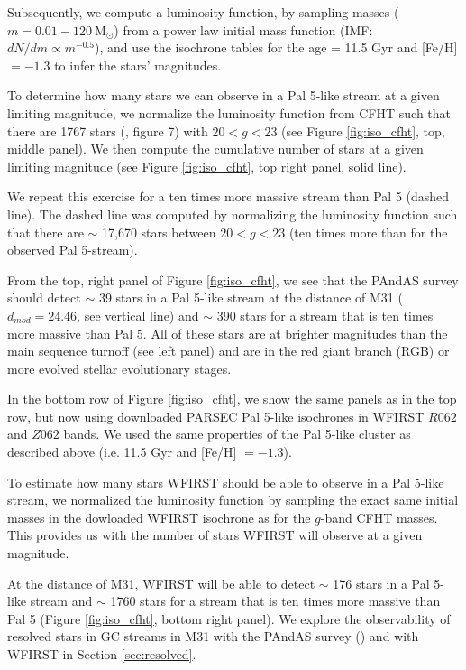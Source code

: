 \documentclass[twocolumn]{aastex62}
\newcommand{\msun}{\textrm{M}_\odot}
\begin{document}
Subsequently, we compute a luminosity function, by sampling masses ($m = 0.01 - 120 ~\msun$) from a power law initial mass function (IMF: $dN/dm \propto m^{-0.5}$), and use the isochrone tables for the age = 11.5 Gyr and [Fe/H] $= -1.3$ to infer the stars' magnitudes. 

To determine how many stars we can observe in a Pal 5-like stream at a given limiting magnitude, we normalize the luminosity function from CFHT such that there are 1767 stars (\citealt{ibata16}, figure 7) with $20 < g < 23$ (see Figure \ref{fig:iso_cfht}, top, middle panel). We then compute the cumulative number of stars at a given limiting magnitude (see Figure \ref{fig:iso_cfht}, top right panel, solid line).

We repeat this exercise for a ten times more massive stream than Pal 5 (dashed line). The dashed line was computed by normalizing the luminosity function such that there are $\sim$ 17,670 stars between $20 < g < 23$ (ten times more than for the observed Pal 5-stream). 

From the top, right panel of Figure \ref{fig:iso_cfht}, we see that the PAndAS survey should detect $\sim$ 39 stars in a Pal 5-like stream at the distance of M31 ($d_{mod} = 24.46$, see vertical line) and $\sim$ 390 stars for a stream that is ten times more massive than Pal 5. All of these stars are at brighter magnitudes than the main sequence turnoff (see left panel) and are in the red giant branch (RGB) or more evolved stellar evolutionary stages. 

In the bottom row of Figure \ref{fig:iso_cfht}, we show the same panels as in the top row, but now using downloaded PARSEC Pal 5-like isochrones in WFIRST $R062$ and $Z062$ bands. We used the same properties of the Pal 5-like cluster as described above (i.e. 11.5 Gyr and [Fe/H] $= -1.3$). 

To estimate how many stars WFIRST should be able to observe in a Pal 5-like stream, we normalized the luminosity function by sampling the exact same initial masses in the dowloaded WFIRST isochrone as for the $g$-band CFHT masses. This provides us with the number of stars WFIRST will observe at a given magnitude. 

At the distance of M31, WFIRST will be able to detect $\sim$ 176 stars in a Pal 5-like stream and $\sim$ 1760 stars for a stream that is ten times more massive than Pal 5 (Figure \ref{fig:iso_cfht}, bottom right panel). We explore the observability of resolved stars in GC streams in M31 with the PAndAS survey (\citealt{mcconnachie09}) and with WFIRST in Section \ref{sec:resolved}. 
\end{document}
